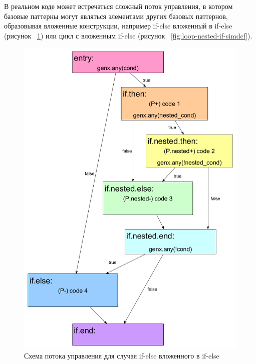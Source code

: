 В реальном коде может встречаться сложный поток управления, в котором базовые
паттерны могут являться элементами других базовых паттернов, образовывая
вложенные конструкции, например if-else вложенный в if-else (рисунок
~\ref{fig:nested-if-simdcf}) или цикл с вложенным if-else (рисунок
~\ref{fig:loop-nested-if-simdcf}).
\begin{figure}
  \centering
  \includegraphics[scale=0.27]{Images/nested-if-FE-colored.png}
  \caption{Схема потока управления для случая if-else вложенного в if-else}
  \label{fig:nested-if-simdcf}
\end{figure}
